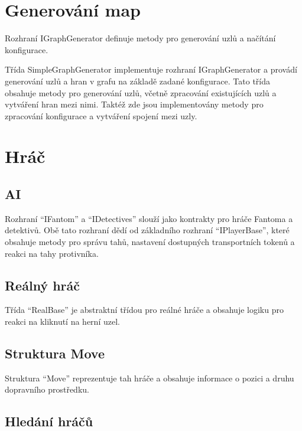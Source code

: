 \section{Generování map}\label{generovuxe1nuxed-map}

Rozhraní IGraphGenerator definuje metody pro generování uzlů a načítání
konfigurace.

Třída SimpleGraphGenerator implementuje rozhraní IGraphGenerator a
provádí generování uzlů a hran v grafu na základě zadané konfigurace.
Tato třída obsahuje metody pro generování uzlů, včetně zpracování
existujících uzlů a vytváření hran mezi nimi. Taktéž zde jsou
implementovány metody pro zpracování konfigurace a vytváření spojení
mezi uzly.

\section{Hráč}\label{hruxe1ux10d}

\subsection{AI}\label{ai}

Rozhraní ``IFantom'' a ``IDetectives'' slouží jako kontrakty pro hráče
Fantoma a detektivů. Obě tato rozhraní dědí od základního rozhraní
``IPlayerBase'', které obsahuje metody pro správu tahů, nastavení
dostupných transportních tokenů a reakci na tahy protivníka.

\subsection{Reálný hráč}\label{reuxe1lnuxfd-hruxe1ux10d}

Třída ``RealBase'' je abstraktní třídou pro reálné hráče a obsahuje
logiku pro reakci na kliknutí na herní uzel.

\subsection{Struktura Move}\label{struktura-move}

Struktura ``Move'' reprezentuje tah hráče a obsahuje informace o pozici
a druhu dopravního prostředku.

\subsection{Hledání hráčů}\label{hleduxe1nuxed-hruxe1ux10dux16f}

